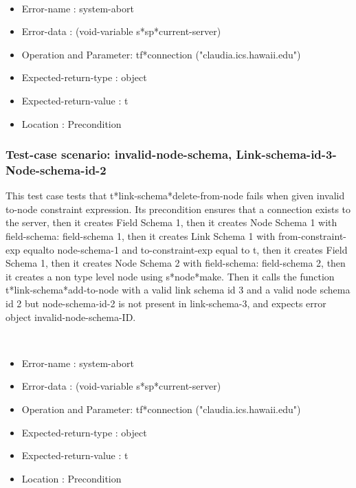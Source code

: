 \
\begin {itemize}
\item 	Error-name             : system-abort
\item Error-data             : (void-variable s*sp*current-server)
\item Operation and Parameter: tf*connection ("claudia.ics.hawaii.edu")
\item Expected-return-type   : object
\item Expected-return-value  : t
\item Location               : Precondition



\end {itemize}
\subsubsection {Test-case scenario: invalid-node-schema, Link-schema-id-3-Node-schema-id-2}


This test case tests that t*link-schema*delete-from-node fails when given invalid to-node constraint expression.
Its precondition ensures that a connection exists to the server, then it creates Field Schema 1, then it creates Node Schema 1 with field-schema: field-schema 1, then it creates Link Schema 1 with from-constraint-exp equalto node-schema-1 and to-constraint-exp equal to t, then it creates Field Schema 1, then it creates Node Schema 2 with field-schema: field-schema 2, then it creates a non type level node using s*node*make.
Then it calls the function t*link-schema*add-to-node  with a valid link schema id 3 and a valid node schema id 2 but node-schema-id-2 is not present in link-schema-3, and expects error object invalid-node-schema-ID.



\
\begin {itemize}
\item 	Error-name             : system-abort
\item Error-data             : (void-variable s*sp*current-server)
\item Operation and Parameter: tf*connection ("claudia.ics.hawaii.edu")
\item Expected-return-type   : object
\item Expected-return-value  : t
\item Location               : Precondition



\end {itemize}
